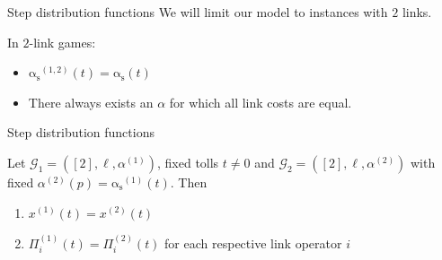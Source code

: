 \documentclass{beamer}
\newcommand{\as}{\mathrm{\alpha_s}}
\newcommand{\Gm}{\mathcal{G}}
\begin{document}
\begin{frame}{Step distribution functions}
	We will limit our model to instances with $2$ links.

	In $2$-link games:
	\begin{itemize}
		\item $\as^{(1, 2)}(t) = \as(t)$
		\item There always exists an $\alpha$ for which all link costs are equal.
	\end{itemize}
\end{frame}

\begin{frame}{Step distribution functions}
	\begin{lemma}
		Let $\Gm_1 = ([2], \ell, \alpha^{(1)})$, fixed tolls $t \ne 0$ and $\Gm_2 = ([2], \ell, \alpha^{(2)})$ with fixed $\alpha^{(2)}(p) = \as^{(1)}(t)$.
		Then
		\begin{enumerate}[$(i)$]
			\item $x^{(1)}(t) = x^{(2)}(t)$
			\item $\Pi_i^{(1)}(t) = \Pi_i^{(2)}(t)$ for each respective link operator $i$
		\end{enumerate}
	\end{lemma}
\end{frame}
\end{document}
